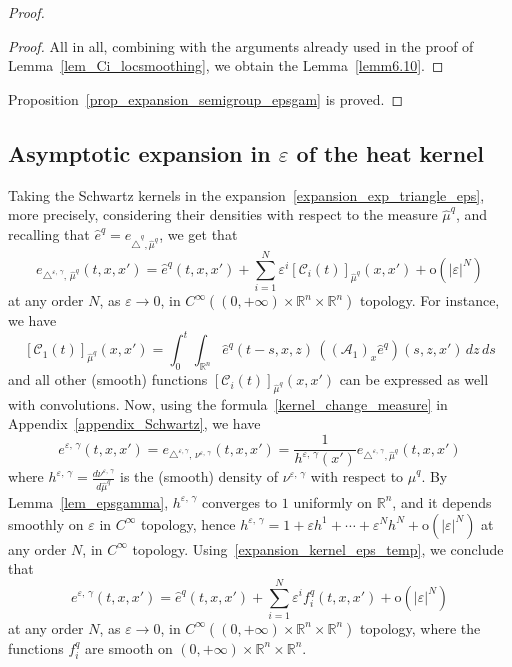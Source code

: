 \documentclass[10pt]{amsart}
\theoremstyle{definition}\newtheorem{defi}[theo]{Definition}\newtheorem{rema}[theo]{Remark}\newtheorem{exam}[theo]{Example}\newtheorem{exem}[theo]{Example}\newtheorem{nota}[theo]{Notation}
\newcommand*\R{\mathbb{R}}
\newcommand{\calA}{\mathcal{A}}
\newcommand{\calC}{\mathcal{C}}
\newcommand{\rmo}{\mathrm{o}}
\begin{document}
\begin{proof}
\begin{proof}
All in all, combining with the arguments already used in the proof of Lemma~\ref{lem_Ci_locsmoothing}, we obtain the Lemma~\ref{lemm6.10}.
\end{proof}


Proposition~\ref{prop_expansion_semigroup_epsgam} is proved.
\end{proof}



\subsection{Asymptotic expansion in \texorpdfstring{$\varepsilon$}{varepsilon} of the heat kernel}\label{taking_Skernels}
Taking the Schwartz kernels in the expansion~\eqref{expansion_exp_triangle_eps}, more precisely, considering their densities with respect to the measure $\widehat{\mu}^{q}$, and recalling that $\widehat{e}^{q} = e_{\widehat{\triangle}^{q},\widehat{\mu}^{q}}$, we get that
\begin{equation}\label{expansion_kernel_eps_temp}
e_{\triangle^{\varepsilon,\,\gamma},\,\widehat{\mu}^{q}}(t,x,x') = \widehat{e}^{q}(t,x,x') + \sum_{i=1}^N \varepsilon^i [\calC_i(t)]_{\widehat{\mu}^{q}}(x,x') +\rmo\left(\vert\varepsilon\vert^N\right)
\end{equation}
at any order $N$, as $\varepsilon\rightarrow 0$, in $C^\infty((0,+\infty)\times\R^n\times\R^n)$ topology. For instance, we have
\[
[\calC_1(t)]_{\widehat{\mu}^{q}}(x,x') = \int_0^t \int_{\R^n} \widehat{e}^{q}(t-s,x,z) \, \left((\calA_1)_x \widehat{e}^{q}\right) (s,z,x') \, dz\, ds
\]
and all other (smooth) functions $[\calC_i(t)]_{\widehat{\mu}^{q}}(x,x')$ can be expressed as well with convolutions. Now, using the formula~\eqref{kernel_change_measure} in Appendix~\ref{appendix_Schwartz}, we have
\[
e^{\varepsilon,\,\gamma}(t,x,x') = e_{\triangle^{\varepsilon,\gamma},\,\nu^{\varepsilon,\,\gamma}}(t,x,x') = \frac{1}{h^{\varepsilon,\,\gamma}(x')} e_{\triangle^{\varepsilon,\,\gamma},\widehat{\mu}^{q}}(t,x,x')
\]
where $h^{\varepsilon,\,\gamma} = \frac{d \nu^{\varepsilon,\,\gamma}}{d\widehat{\mu}^{q}}$ is the (smooth) density of $\nu^{\varepsilon,\,\gamma}$ with respect to $\widehat{\mu}^{q}$. By Lemma~\ref{lem_epsgamma}, $h^{\varepsilon,\,\gamma}$ converges to $1$ uniformly on $\R^n$, and it depends smoothly on $\varepsilon$ in $C^\infty$ topology, hence $h^{\varepsilon,\,\gamma} = 1 + \varepsilon h^1 + \cdots + \varepsilon^Nh^N+\rmo(\vert\varepsilon\vert^N)$ at any order $N$, in $C^\infty$ topology. Using~\eqref{expansion_kernel_eps_temp}, we conclude that
\begin{equation}\label{expansion_kernel_epsgamma}
e^{\varepsilon,\,\gamma}(t,x,x') = \widehat{e}^{q}(t,x,x') + \sum_{i=1}^N \varepsilon^i f_i^{q}(t,x,x') +\rmo\left(\vert\varepsilon\vert^N\right)
\end{equation}
at any order $N$, as $\varepsilon\rightarrow 0$, in $C^\infty((0,+\infty)\times\R^n\times\R^n)$ topology, where the functions $f_i^{q}$ are smooth on $(0,+\infty)\times\R^n\times\R^n$.
\end{document}

